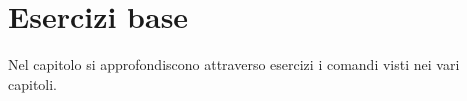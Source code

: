 \chapter{Esercizi base}
\label{chapter:Esercizi-base-Linux}
Nel capitolo si approfondiscono attraverso esercizi i comandi visti nei vari capitoli.





























































